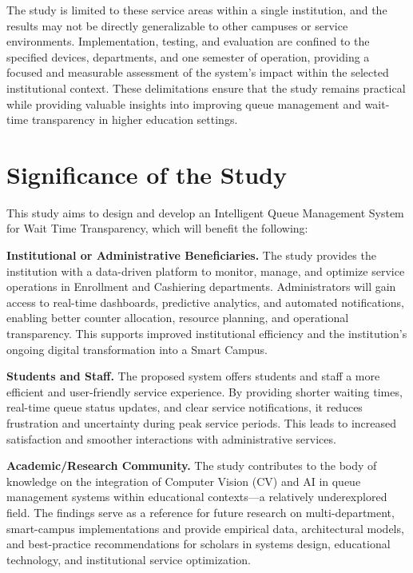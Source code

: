 \documentclass{research}
\begin{document}
The study is limited to these service areas within a single institution, and the results may not be directly generalizable to other campuses or service environments. Implementation, testing, and evaluation are confined to the specified devices, departments, and one semester of operation, providing a focused and measurable assessment of the system's impact within the selected institutional context. These delimitations ensure that the study remains practical while providing valuable insights into improving queue management and wait-time transparency in higher education settings.

\section{Significance of the Study}

This study aims to design and develop an Intelligent Queue Management System for Wait Time Transparency, which will benefit the following:

\medskip
\indent\textbf{Institutional or Administrative Beneficiaries.} The study provides the institution with a data-driven platform to monitor, manage, and optimize service operations in Enrollment and Cashiering departments. Administrators will gain access to real-time dashboards, predictive analytics, and automated notifications, enabling better counter allocation, resource planning, and operational transparency. This supports improved institutional efficiency and the institution's ongoing digital transformation into a Smart Campus.

\medskip
\indent\textbf{Students and Staff.} The proposed system offers students and staff a more efficient and user-friendly service experience. By providing shorter waiting times, real-time queue status updates, and clear service notifications, it reduces frustration and uncertainty during peak service periods. This leads to increased satisfaction and smoother interactions with administrative services.

\medskip
\indent\textbf{Academic/Research Community.} The study contributes to the body of knowledge on the integration of Computer Vision (CV) and AI in queue management systems within educational contexts—a relatively underexplored field. The findings serve as a reference for future research on multi-department, smart-campus implementations and provide empirical data, architectural models, and best-practice recommendations for scholars in systems design, educational technology, and institutional service optimization.
\end{document}

